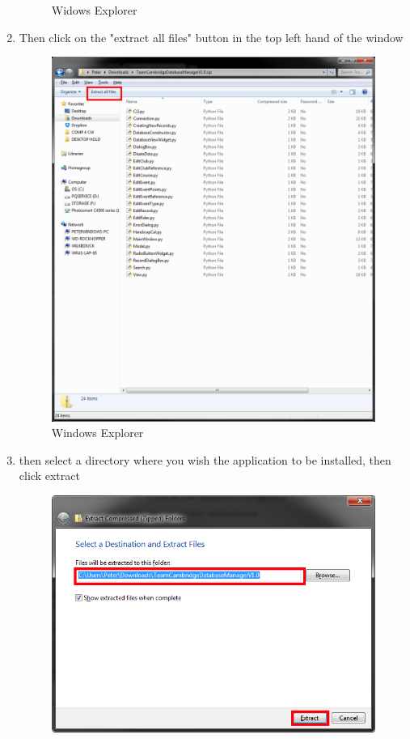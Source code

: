 \begin{enumerate}
\begin{figure}[H]
\caption{Widows Explorer} \label{fig:SyIsP2}
\end{figure}
\item Then click on the "extract all files" button in the top left hand of the window
\begin{figure}[H]
\includegraphics[width=\textwidth]{./Manual/SystemInstall/Part3.png}
\caption{Windows Explorer} \label{fig:SyIsP3}
\end{figure}
\item then select a directory where you wish the application to be installed, then click extract
\begin{figure}[H]
\includegraphics[width=\textwidth]{./Manual/SystemInstall/Part4.png}

\end{figure}
\end{enumerate}
